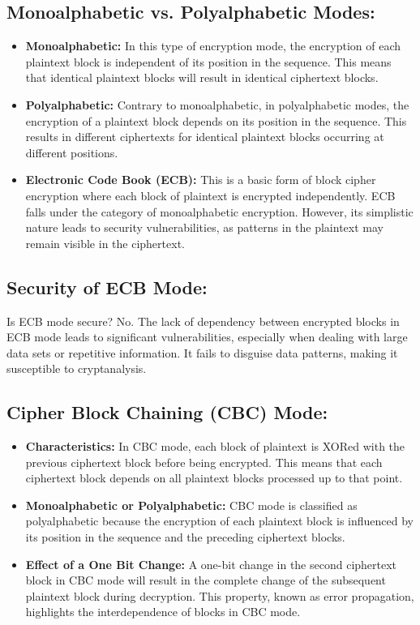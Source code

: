 \documentclass[12pt]{article}
\begin{document}
\subsection*{Monoalphabetic vs. Polyalphabetic Modes:}
\begin{itemize}
    \item \textbf{Monoalphabetic:} In this type of encryption mode, the encryption of each plaintext block is independent of its position in the sequence. This means that identical plaintext blocks will result in identical ciphertext blocks.
    \item \textbf{Polyalphabetic:} Contrary to monoalphabetic, in polyalphabetic modes, the encryption of a plaintext block depends on its position in the sequence. This results in different ciphertexts for identical plaintext blocks occurring at different positions.
    \item \textbf{Electronic Code Book (ECB):} This is a basic form of block cipher encryption where each block of plaintext is encrypted independently. ECB falls under the category of monoalphabetic encryption. However, its simplistic nature leads to security vulnerabilities, as patterns in the plaintext may remain visible in the ciphertext.
\end{itemize}

\subsection*{Security of ECB Mode:}
Is ECB mode secure? No. The lack of dependency between encrypted blocks in ECB mode leads to significant vulnerabilities, especially when dealing with large data sets or repetitive information. It fails to disguise data patterns, making it susceptible to cryptanalysis.

\subsection*{Cipher Block Chaining (CBC) Mode:}
\begin{itemize}
    \item \textbf{Characteristics:} In CBC mode, each block of plaintext is XORed with the previous ciphertext block before being encrypted. This means that each ciphertext block depends on all plaintext blocks processed up to that point.
    \item \textbf{Monoalphabetic or Polyalphabetic:} CBC mode is classified as polyalphabetic because the encryption of each plaintext block is influenced by its position in the sequence and the preceding ciphertext blocks.
    \item \textbf{Effect of a One Bit Change:} A one-bit change in the second ciphertext block in CBC mode will result in the complete change of the subsequent plaintext block during decryption. This property, known as error propagation, highlights the interdependence of blocks in CBC mode.
\end{itemize}
\end{document}
